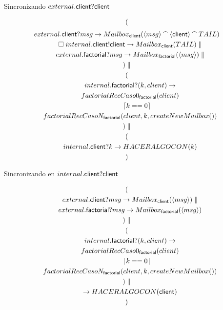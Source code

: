 \documentclass[fleqn]{article}
\newcommand{\myList}[1]{\langle #1 \rangle}
\newcommand{\myCons}[0]{\mathbin{\raise 0.8ex\hbox{$\smallfrown$}}}
\begin{document}
Sincronizando $external.\mathsf{client}?\mathsf{client}$

\begin{gather*}
( \\ 
external.\mbc?msg \rightarrow Mailbox_\mbc(\myList{msg} \myCons \myList{\mbc} \myCons TAIL) \\ 
\quad \square \; internal.\mbc!\mbc \rightarrow Mailbox_\mbc(TAIL)  \parallel \\
\quad external.\mbf?msg \rightarrow Mailbox_\mbf(\myList{msg}) \parallel \\
) \parallel \\
( \\
\quad internal.\mbf?(k,client) \rightarrow \\
\quad factorialRecCaso0_\mbf(client) \\
\quad \qquad \lceil k == 0 \rceil \\
\quad factorialRecCasoN_\mbf(client, k, createNewMailbox()) \\
) \parallel \\
( \\
\quad internal.\mbc?k \rightarrow HACERALGOCON(k) \\ 
)
\end{gather*}

Sincronizando en $internal.\mathsf{client}?\mathsf{client}$

\begin{gather*}
( \\ 
\quad external.\mbc?msg \rightarrow Mailbox_\mbc(\myList{msg}) \parallel \\
\quad external.\mbf?msg \rightarrow Mailbox_\mbf(\myList{msg})  \\
) \parallel \\
( \\
\quad internal.\mbf?(k,client) \rightarrow \\
\quad factorialRecCaso0_\mbf(client) \\
\quad \qquad \lceil k == 0 \rceil \\
\quad factorialRecCasoN_\mbf(client, k, createNewMailbox()) \\
) \parallel \\
\quad  \rightarrow HACERALGOCON(\mbc) \\ 
)
\end{gather*}


{}

\end{document}
